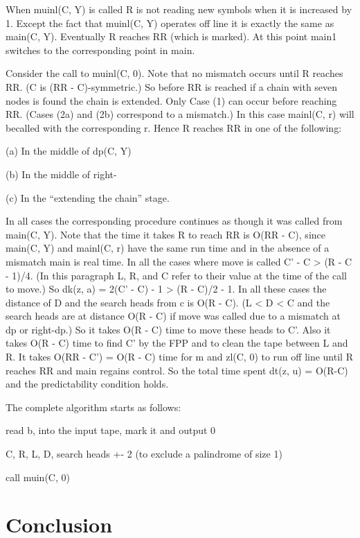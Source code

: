 \documentclass[11pt,a4paper]{report}
\begin{document}
When muinl(C, Y) is called R is not reading new symbols when it is increased by 1.
Except the fact that muinl(C, Y) operates off line it is exactly the same as main(C, Y).
Eventually R reaches RR (which is marked). At this point main1 switches to the corresponding point in main. 

Consider the call to muinl(C, 0). Note that no mismatch occurs until R reaches RR.
(C is (RR - C)-symmetric.) So before RR is reached if a chain with seven nodes is found
the chain is extended. Only Case (1) can occur before reaching RR. (Cases (2a) and (2b)
correspond to a mismatch.) In this case mainl(C, r) will becalled with the corresponding r.
Hence R reaches RR in one of the following:

(a) In the middle of dp(C, Y)

(b) In the middle of right-

(c) In the “extending the chain” stage.

In all cases the corresponding procedure continues as though it was called from
main(C, Y). Note that the time it takes R to reach RR is O(RR - C), since main(C, Y)
and mainl(C, r) have the same run time and in the absence of a mismatch main is real time.
In all the cases where move is called C’ - C > (R - C - 1)/4. (In this paragraph L,
R, and C refer to their value at the time of the call to move.) So dk(z, a) = 2(C’ - C) -
1 > (R - C)/2 - 1. In all these cases the distance of D and the search heads from c is
O(R - C). (L < D < C and the search heads are at distance O(R - C) if move was
called due to a mismatch at dp or right-dp.) So it takes O(R - C) time to move these
heads to C’. Also it takes O(R - C) time to find C’ by the FPP and to clean the tape
between L and R. It takes O(RR - C’) = O(R - C) time for m and zl(C, 0) to run off line
until R reaches RR and main regains control. So the total time spent dt(z, u) = O(R-C)
and the predictability condition holds.

The complete algorithm starts as follows:
\begin{myindentpar}{3cm}

read b, into the input tape, mark it and output 0

C, R, L, D, search heads +- 2 (to exclude a palindrome of size 1)

call muin(C, 0)
\end{myindentpar}

\chapter{Conclusion}
\end{document}
